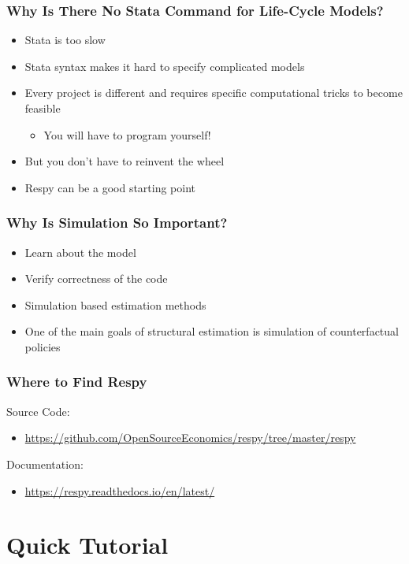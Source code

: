 \documentclass[11pt]{beamer}
\begin{document}
\begin{frame}[c]\frametitle{Why Is There No Stata Command for Life-Cycle Models?}
    \begin{itemize}
        \item Stata is too slow
        \item Stata syntax makes it hard to specify complicated models
        \item Every project is different and requires specific computational tricks to become feasible
        \begin{itemize}
            \item You will have to program yourself!
        \end{itemize}
        \item But you don't have to reinvent the wheel
        \item Respy can be a good starting point
    \end{itemize}
\end{frame}


\begin{frame}[c]\frametitle{Why Is Simulation So Important?}
    \begin{itemize}
      \item Learn about the model
      \item Verify correctness of the code
      \item Simulation based estimation methods
      \item One of the main goals of structural estimation is simulation of counterfactual policies
    \end{itemize}
\end{frame}


\begin{frame}[c]\frametitle{Where to Find Respy}
    \alert{Source Code:}
    \begin{itemize}
      \item \url{https://github.com/OpenSourceEconomics/respy/tree/master/respy}
    \end{itemize}
    \alert{Documentation:}
    \begin{itemize}
      \item \url{https://respy.readthedocs.io/en/latest/}
    \end{itemize}
\end{frame}



\section{Quick Tutorial}
\end{document}
